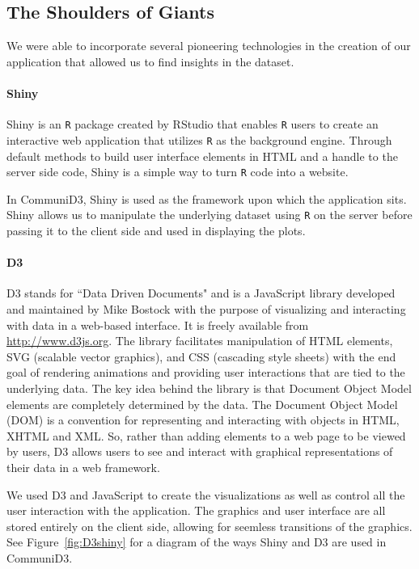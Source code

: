 \documentclass[11pt]{article}\usepackage{knitr}
\begin{document}
\subsection{The Shoulders of Giants}
We were able to incorporate several pioneering technologies in the creation of our application that allowed us to find insights in the dataset.

\paragraph{Shiny}
Shiny \cite{rs-shiny} is an {\tt R} package created by RStudio that enables {\tt R} users to create an interactive web application that utilizes {\tt R} as the background engine. Through default methods to build user interface elements in HTML and a handle to the server side code, Shiny is a simple way to turn {\tt R} code into a website. 

In CommuniD3, Shiny is used as the framework upon which the application sits. Shiny allows us to manipulate the underlying dataset using {\tt R} on the server before passing it to the client side and used in displaying the plots.

\paragraph{D3}
D3 \cite{mb-d3} stands for ``Data Driven Documents" and is a JavaScript library developed and maintained by Mike Bostock with the  purpose of visualizing and interacting with data in a web-based interface. It is freely available from \url{http://www.d3js.org}. The library facilitates manipulation of HTML elements, SVG (scalable vector graphics), and CSS (cascading style sheets) with the end goal of rendering animations and providing user interactions that are tied to the underlying data. The key idea behind the library is that Document Object Model elements are completely determined by the data. The Document Object Model (DOM) is a convention for representing and interacting with objects in HTML, XHTML and XML. So, rather than adding elements to a web page to be viewed by users, D3 allows users to see and interact with graphical representations of their data in a web framework. 

We used D3 and JavaScript to create the visualizations as well as control all the user interaction with the application. The graphics and user interface are all stored entirely on the client side, allowing for seemless transitions of the graphics. See Figure~\ref{fig:D3shiny} for a diagram of the ways Shiny and D3 are used in CommuniD3.
\end{document}
